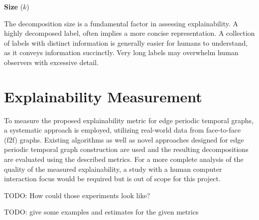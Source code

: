 \textbf{Size} ($k$)

The decomposition size is a fundamental factor in assessing explainability.
A highly decomposed label, often implies a more concise representation.
A collection of labels with distinct information is generally easier for humans to understand, as it conveys information succinctly.
Very long labels may overwhelm human observers with excessive detail.


\section{Explainability Measurement}

To measure the proposed explainability metric for edge periodic temporal graphs, a systematic approach is employed, utilizing real-world data from face-to-face (f2f) graphs.
Existing algorithms as well as novel approaches designed for edge periodic temporal graph construction are used and the resulting decompositions are evaluated using the described metrics.
For a more complete analysis of the quality of the measured explainability, a study with a human computer interaction focus would be required but is out of scope for this project.

TODO: How could those experiments look like?

TODO: give some examples and estimates for the given metrics